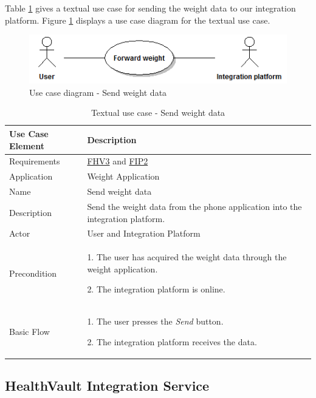 Table \ref{table:use-case-send-weight-data} gives a textual use case for sending the weight data to our
integration platform. Figure \ref{figure:use-case-diagram-send-weight} displays a use case diagram for the
textual use case.

\begin{figure}[H]
\centering
\includegraphics[scale=0.75]{../Figures/use-case-diagram-send-weight.png}
\caption{Use case diagram - Send weight data}
\label{figure:use-case-diagram-send-weight}
\end{figure}

\begin{table}[H]
\begin{center}
\begin{tabular}{ l | p{10cm} }
  \hline
  \textbf{Use Case Element} & \textbf{Description} \\ \hline\hline
  Requirements & \hyperref[table:reqweight]{FHV3} and \hyperref[table:reqip]{FIP2}\\ \hline
  Application & Weight Application \\ \hline
  Name & Send weight data \\ \hline
  Description & Send the weight data from the phone application into the integration platform. \\ \hline
  Actor & User and Integration Platform \\ \hline
  Precondition &
    \par 1. The user has acquired the weight data through the weight application.
    \par 2. The integration platform is online.
  \\ \hline
  Basic Flow & 
  	\par 1. The user presses the \textit{Send} button.
  	\par 2. The integration platform receives the data.
  \\ \hline
\end{tabular}
\end{center}
\caption{Textual use case - Send weight data}
\label{table:use-case-send-weight-data}
\end{table}

\subsection{HealthVault Integration Service}

